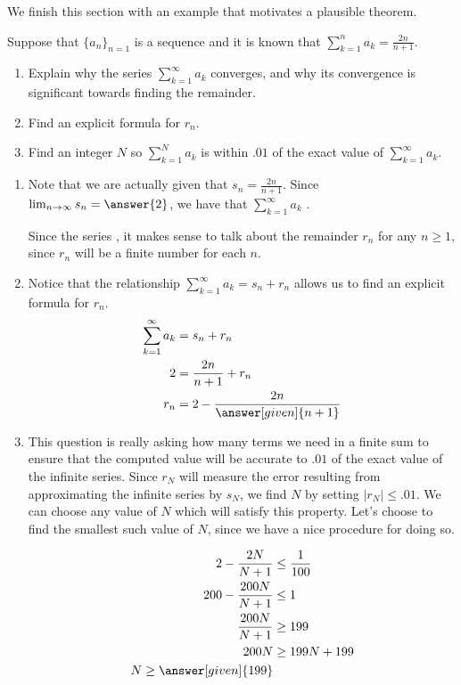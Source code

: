 \documentclass{ximera}
\begin{document}
We finish this section with an example that motivates a plausible theorem.


\begin{example}
Suppose that $\{a_n\}_{n=1}$ is a sequence and it is known that $\sum_{k=1}^{n} a_k = \frac{2n}{n+1}$.  
\begin{enumerate}
    \item Explain why the series $\sum_{k=1}^{\infty} a_k$ converges, and why its convergence is significant towards finding the remainder.
    \item Find an explicit formula for $r_n$.
    \item Find an integer $N$ so $\sum_{k=1}^{N} a_k$ is within $.01$ of the exact value of $\sum_{k=1}^{\infty} a_k$.
\end{enumerate} 

\begin{explanation}
\begin{enumerate}
\item Note that we are actually given that $s_n = \frac{2n}{n+1}$.  Since $\lim_{n \to \infty} s_n = \answer{2}$, we have that $\sum_{k=1}^{\infty} a_k$  .

Since the series , it makes sense to talk about the remainder $r_n$ for any $n \geq 1$, since $r_n$ will be a finite number for each $n$.  

\item Notice that the relationship $\sum_{k=1}^{\infty} a_k = s_n+r_n$ allows us to find an explicit formula for $r_n$.
\begin{align*}
\sum_{k=1}^{\infty} a_k &= s_n+r_n \\
2 &= \frac{2n}{n+1}+r_n \\
r_n &= 2-\frac{2n}{\answer[given]{n+1}}
\end{align*}


\item This question is really asking how many terms we need in a finite sum to ensure that the computed value will be accurate to $.01$ of the exact value of the infinite series.  Since $r_N$ will measure the error resulting from approximating the infinite series by $s_N$, we find $N$ by setting $\vert r_N \vert \leq .01$.  We can choose any value of $N$ which will satisfy this property.  Let's choose to find the smallest such value of $N$, since we have a nice procedure for doing so.

\begin{align*}
2-\frac{2N}{N+1} &\leq \frac{1}{100} \\
200-\frac{200N}{N+1} & \leq 1 \\
\frac{200N}{N+1} & \geq 199 \\
200N & \geq 199N+199 \\
N \geq \answer[given]{199}
\end{align*}


\end{enumerate}
\end{explanation}
\end{example}
\end{document}
